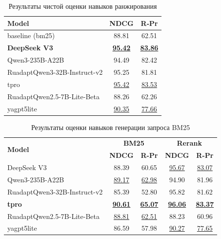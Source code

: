 \documentclass{article}
\begin{document}
\begin{table}[ht!]
\centering
\caption{Результаты чистой оценки навыков ранжирования}
\begin{tabular}{l|c|c}
\hline
\textbf{Model} & \textbf{NDCG} & \textbf{R‑Pr} \\
\hline
baseline (bm25)                                     & 88.81 & 62.51 \\
\hline
\textbf{DeepSeek V3}                                & \uline{\textbf{95.42}} & \uline{\textbf{83.86}} \\
Qwen3-235B-A22B                                     & 94.49 & 82.42 \\
\hline
RuadaptQwen3-32B-Instruct-v2                        & 95.25 & 81.81 \\
tpro                                                & \uline{95.42} & \uline{83.53} \\
\hline
RuadaptQwen2.5-7B-\allowbreak Lite-\allowbreak Beta & 88.26 & 62.26 \\
yagpt5lite                                          & \uline{90.35} & \uline{77.66} \\
\hline
\end{tabular}
\label{tab:query_ref}
\end{table}

\begin{table}[ht]
\centering
\caption{Результаты оценки навыков генерации запроса BM25}
\begin{tabular}{l|cc|cc}
\hline
\multirow{2}{*}{\textbf{Model}} & \multicolumn{2}{c|}{\textbf{BM25}} & \multicolumn{2}{c}{\textbf{Rerank}} \\
 & \textbf{NDCG} & \textbf{R-Pr} & \textbf{NDCG} & \textbf{R-Pr} \\
\hline
DeepSeek V3                                         & 88.39 & 60.65 & \uline{95.67} & \uline{83.07} \\
Qwen3-235B-A22B                                     & \uline{89.17} & \uline{62.98} & 94.90 & 81.96 \\
\hline
RuadaptQwen3-32B-Instruct-v2                        & 85.39 & 52.80 & 95.82 & 81.62 \\
\textbf{tpro}                                       & \uline{\textbf{90.61}} & \uline{\textbf{65.07}} & \uline{\textbf{96.06}} & \uline{\textbf{83.37}} \\
\hline
RuadaptQwen2.5-7B-\allowbreak Lite-\allowbreak Beta & \uline{88.81} & \uline{62.51} & 88.23 & 60.96 \\
yagpt5lite                                          & 86.59 & 57.98 & \uline{90.27} & \uline{77.65} \\
\hline
\end{tabular}
\label{tab:query_def}
\end{table}
\end{document}
